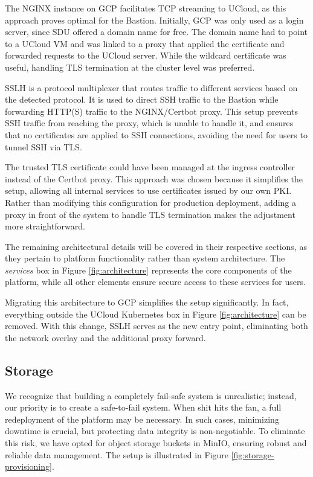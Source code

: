 The NGINX instance on GCP facilitates TCP streaming to UCloud, as this approach proves optimal for the Bastion. Initially, GCP was only used as a login server, since SDU offered a domain name for free. The domain name had to point to a UCloud VM and was linked to a proxy that applied the certificate and forwarded requests to the UCloud server. While the wildcard certificate was useful, handling TLS termination at the cluster level was preferred.

SSLH is a protocol multiplexer that routes traffic to different services based on the detected protocol. It is used to direct SSH traffic to the Bastion while forwarding HTTP(S) traffic to the NGINX/Certbot proxy. This setup prevents SSH traffic from reaching the proxy, which is unable to handle it, and ensures that no certificates are applied to SSH connections, avoiding the need for users to tunnel SSH via TLS.

The trusted TLS certificate could have been managed at the ingress controller instead of the Certbot proxy. This approach was chosen because it simplifies the setup, allowing all internal services to use certificates issued by our own PKI. Rather than modifying this configuration for production deployment, adding a proxy in front of the system to handle TLS termination makes the adjustment more straightforward.

The remaining architectural details will be covered in their respective sections, as they pertain to platform functionality rather than system architecture. The \textit{services} box in Figure \ref{fig:architecture} represents the core components of the platform, while all other elements ensure secure access to these services for users.

Migrating this architecture to GCP simplifies the setup significantly. In fact, everything outside the UCloud Kubernetes box in Figure \ref{fig:architecture} can be removed. With this change, SSLH serves as the new entry point, eliminating both the network overlay and the additional proxy forward. 

\subsection{Storage}

We recognize that building a completely fail-safe system is unrealistic; instead, our priority is to create a safe-to-fail system. When shit hits the fan, a full redeployment of the platform may be necessary. In such cases, minimizing downtime is crucial, but protecting data integrity is non-negotiable. To eliminate this risk, we have opted for object storage buckets in MinIO, ensuring robust and reliable data management. The setup is illustrated in Figure \ref{fig:storage-provisioning}.

